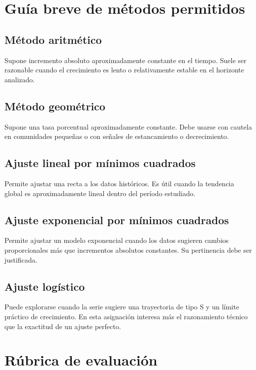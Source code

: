 \documentclass[11pt]{scrartcl}
\begin{document}
\appendix
\section{Guía breve de métodos permitidos}

\subsection{Método aritmético}
Supone incremento absoluto aproximadamente constante en el tiempo.
Suele ser razonable cuando el crecimiento es lento o relativamente
estable en el horizonte analizado.

\subsection{Método geométrico}
Supone una tasa porcentual aproximadamente constante. Debe usarse con
cautela en comunidades pequeñas o con señales de estancamiento o
decrecimiento.

\subsection{Ajuste lineal por mínimos cuadrados}
Permite ajustar una recta a los datos históricos. Es útil cuando la
tendencia global es aproximadamente lineal dentro del período
estudiado.

\subsection{Ajuste exponencial por mínimos cuadrados}
Permite ajustar un modelo exponencial cuando los datos sugieren cambios
proporcionales más que incrementos absolutos constantes. Su pertinencia
debe ser justificada.

\subsection{Ajuste logístico}
Puede explorarse cuando la serie sugiere una trayectoria de tipo S y un
límite práctico de crecimiento. En esta asignación interesa más el
razonamiento técnico que la exactitud de un ajuste perfecto.

\section{Rúbrica de evaluación}
\end{document}

